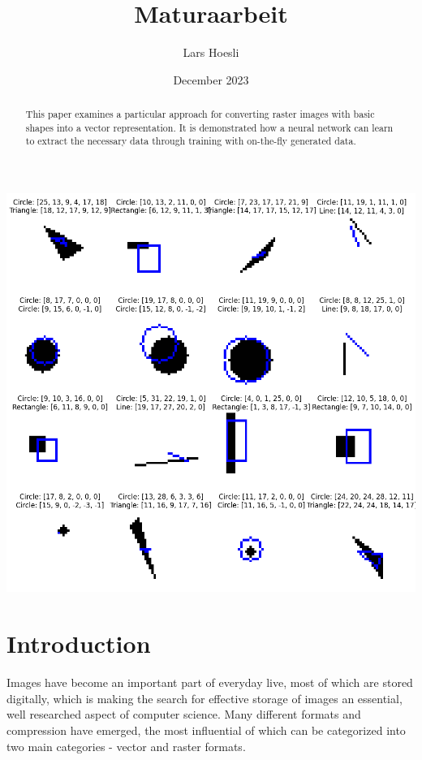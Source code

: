 \documentclass[12pt, a4paper, titlepage]{report}
\title{Maturaarbeit}
\author{Lars Hoesli}
\date{December 2023}
\begin{document}
\begin{titlepage}
    \centering

    \Huge{\textbf{\inserttitle}}
    \par
    \LARGE{\insertauthor}

    \large{\insertdate}
    \vspace{2cm}

    \includegraphics[width=1.0\textwidth]{../rc/images/all_shapes_approx_visual1.png}
    \vfill
    \begin{abstract}
		 This paper examines a particular approach for converting raster images with basic shapes into a vector representation.
		 It is demonstrated how a neural network can learn to extract the necessary data through training with on-the-fly generated data.
    \end{abstract}
\end{titlepage}


\chapter{Introduction}

Images have become an important part of everyday live, most of which are stored digitally, which is making the search for effective storage of images an essential, well researched aspect of computer science.
Many different formats and compression have emerged, the most influential of which can be categorized into two main categories - vector and raster formats.
\end{document}
